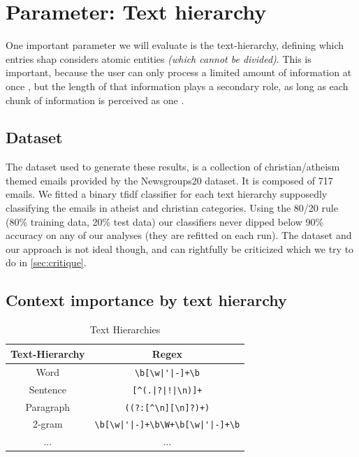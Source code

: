 \section{Parameter: Text hierarchy}

One important parameter we will evaluate is the text-hierarchy, defining which entries shap considers atomic entities \textit{(which cannot be divided)}. This is important, because the user can only process a limited amount of information at once \cite{Baecker2014}, but the length of that information plays a secondary role, as long as each chunk of information is perceived as one \cite{Fountain2012}.

\subsection{Dataset}

The dataset used to generate these results, is a collection of christian/atheism themed emails provided by the Newsgroups20 \cite{Newsgroups20} dataset. It is composed of 717 emails. We fitted a binary tfidf classifier for each text hierarchy supposedly classifying the emails in atheist and christian categories. Using the 80/20 rule (80\% training data, 20\% test data) our classifiers never dipped below 90\% accuracy on any of our analyses (they are refitted on each run). The dataset and our approach is not ideal though, and can rightfully be criticized which we try to do in \autoref{sec:critique}.

\subsection{Context importance by text hierarchy}


\begin{table}[H]
    \centering
    \begin{tabular}{c|c}
         \textbf{Text-Hierarchy} & \textbf{Regex}\\ \hline
         Word & \verb/\b[\w|'|-]+\b/ \\
         Sentence & \verb/[^(.|?|!|\n)]+/ \\
         Paragraph & \verb/((?:[^\n][\n]?)+)/ \\
         2-gram & \verb/\b[\w|'|-]+\b\W+\b[\w|'|-]+\b/ \\
         ... & ...
    \end{tabular}
    \caption{Text Hierarchies}
    \label{tab:textHierarchies}
\end{table}

